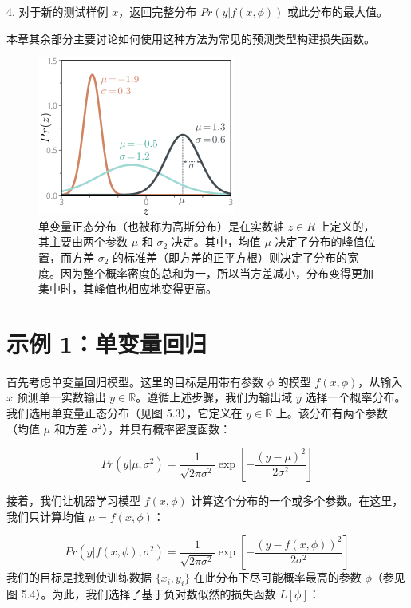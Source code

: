 4. 对于新的测试样例 \(x\)，返回完整分布 \(Pr(y|f(x, \phi))\) 或此分布的最大值。

本章其余部分主要讨论如何使用这种方法为常见的预测类型构建损失函数。

\begin{figure}[ht!]
	\centering
	\includegraphics[width=0.7\linewidth]{png/chapter5/LossNorm.png}
	\caption{单变量正态分布（也被称为高斯分布）是在实数轴 \(z \in R\) 上定义的，其主要由两个参数 \(\mu\) 和 \(\sigma_2\) 决定。其中，均值 \(\mu\) 决定了分布的峰值位置，而方差 \(\sigma_2\) 的标准差（即方差的正平方根）则决定了分布的宽度。因为整个概率密度的总和为一，所以当方差减小，分布变得更加集中时，其峰值也相应地变得更高。}
\end{figure}

\section{示例 1：单变量回归}

首先考虑单变量回归模型。这里的目标是用带有参数 \(\phi\) 的模型 \(f(x, \phi)\)，从输入 \(x\) 预测单一实数输出 \(y \in \mathbb{R}\)。遵循上述步骤，我们为输出域 \(y\) 选择一个概率分布。我们选用单变量正态分布（见图 5.3），它定义在 \(y \in \mathbb{R}\) 上。该分布有两个参数（均值 \(\mu\) 和方差 \(\sigma^2\)），并具有概率密度函数：

\begin{equation}
	Pr(y|\mu, \sigma^2) = \frac{1}{\sqrt{2\pi\sigma^2}} \exp \left[ -\frac{(y - \mu)^2}{2\sigma^2} \right] 
\end{equation}

接着，我们让机器学习模型 \(f(x, \phi)\) 计算这个分布的一个或多个参数。在这里，我们只计算均值 \(\mu = f(x, \phi)\)：

\begin{equation}
Pr(y|f(x, \phi), \sigma^2) = \frac{1}{\sqrt{2\pi\sigma^2}} \exp \left[ -\frac{(y - f(x, \phi))^2}{2\sigma^2} \right] 
\end{equation}
我们的目标是找到使训练数据 \(\{x_i, y_i\}\) 在此分布下尽可能概率最高的参数 \(\phi\)（参见图 5.4）。为此，我们选择了基于负对数似然的损失函数 \(L[\phi]\)：

